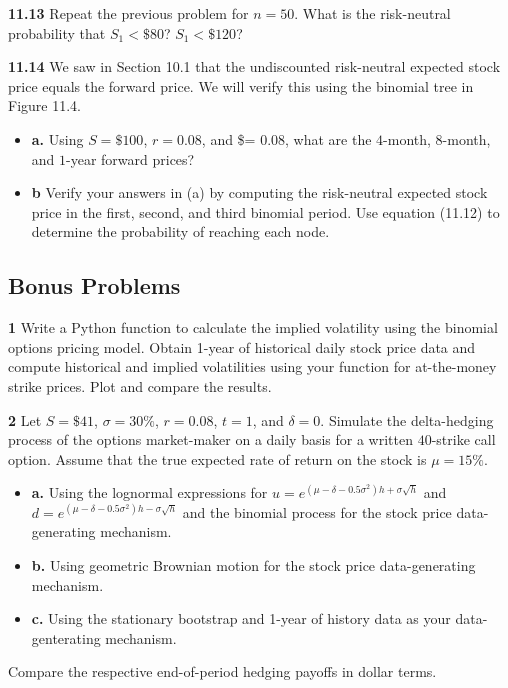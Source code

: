 \documentclass[
  letterpaper,
  DIV=11,
  numbers=noendperiod]{scrartcl}
\begin{document}
\textbf{11.13} Repeat the previous problem for \(n = 50\). What is the
risk-neutral probability that \(S_{1} < \$80\)? \(S_{1} < \$120\)?

\textbf{11.14} We saw in Section 10.1 that the undiscounted risk-neutral
expected stock price equals the forward price. We will verify this using
the binomial tree in Figure 11.4.

\begin{itemize}
\item
  \textbf{a.} Using \(S = \$100\), \(r = 0.08\), and \$\delta = 0.08,
  what are the \(4\)-month, \(8\)-month, and \(1\)-year forward prices?
\item
  \textbf{b} Verify your answers in (a) by computing the risk-neutral
  expected stock price in the first, second, and third binomial period.
  Use equation (11.12) to determine the probability of reaching each
  node.
\end{itemize}

\subsection{Bonus Problems}\label{bonus-problems}

\textbf{1} Write a Python function to calculate the implied volatility
using the binomial options pricing model. Obtain 1-year of historical
daily stock price data and compute historical and implied volatilities
using your function for at-the-money strike prices. Plot and compare the
results.

\textbf{2} Let \(S = \$41\), \(\sigma = 30\%\), \(r = 0.08\), \(t = 1\),
and \(\delta = 0\). Simulate the delta-hedging process of the options
market-maker on a daily basis for a written \(40\)-strike call option.
Assume that the true expected rate of return on the stock is
\(\mu = 15\%\).

\begin{itemize}
\item
  \textbf{a.} Using the lognormal expressions for
  \(u = e^{(\mu - \delta - 0.5\sigma^{2})h + \sigma \sqrt{h}}\) and
  \(d = e^{(\mu - \delta - 0.5\sigma^{2})h - \sigma \sqrt{h}}\) and the
  binomial process for the stock price data-generating mechanism.
\item
  \textbf{b.} Using geometric Brownian motion for the stock price
  data-generating mechanism.
\item
  \textbf{c.} Using the stationary bootstrap and 1-year of history data
  as your data-genterating mechanism.
\end{itemize}

Compare the respective end-of-period hedging payoffs in dollar terms.
\end{document}
